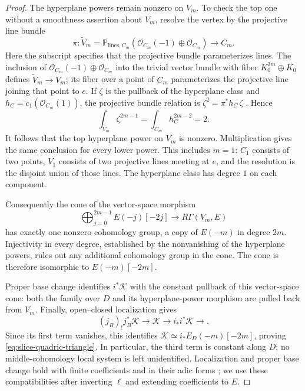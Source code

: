 \begin{proof}
The hyperplane powers remain nonzero on $V_m$.  To check the top one
without a smoothness assertion about $V_m$, resolve the vertex by the
projective line bundle
\[
 \pi:\widetilde V_m
   =\mathbb P_{\mathrm{lines},C_m}
        (\mathcal O_{C_m}(-1)\oplus\mathcal O_{C_m})
       \longrightarrow C_m.
\]
Here the subscript specifies that the projective bundle parameterizes
lines.  The inclusion of $\mathcal O_{C_m}(-1)\oplus\mathcal O_{C_m}$
into the trivial vector bundle with fiber $K_0^{2m}\oplus K_0$
defines $\widetilde V_m\to V_m$; its fiber over a point of $C_m$
parameterizes the projective line joining that point to $e$.
If $\zeta$ is the pullback
of the hyperplane class and $h_C=c_1(\mathcal O_{C_m}(1))$, the
projective bundle relation is $\zeta^2=\pi^*h_C\,\zeta$
\cite[\S23]{MilneEtale}. Hence
\[
 \int_{\widetilde V_m}\zeta^{2m-1}
       =\int_{C_m}h_C^{2m-2}=2.
\]
It follows that the top hyperplane power on $V_m$ is nonzero.
Multiplication gives the same conclusion for every lower power.
This includes $m=1$: $C_1$ consists of two points, $V_1$ consists of
two projective lines meeting at $e$, and the resolution is the
disjoint union of those lines.  The hyperplane class has degree $1$
on each component.

Consequently the cone of the vector-space morphism
\[
 \bigoplus_{j=0}^{2m-1}E(-j)[-2j]
       \longrightarrow R\Gamma(V_m,E)
\]
has exactly one nonzero cohomology group, a copy of $E(-m)$ in degree
$2m$.  Injectivity in every degree, established by the nonvanishing of
the hyperplane powers, rules out any additional cohomology group in
the cone.  The cone is therefore isomorphic to $E(-m)[-2m]$.

Proper base change identifies $i^*\mathcal K$ with the constant
pullback of this vector-space cone: both the family over $D$ and
its hyperplane-power morphism are pulled back from $V_m$.
Finally, open--closed localization gives
\[
 (j_B)_!j_B^*\mathcal K\longrightarrow\mathcal K
                  \longrightarrow i_*i^*\mathcal K\longrightarrow .
\]
Since its first term vanishes, this identifies
$\mathcal K\simeq i_*E_D(-m)[-2m]$, proving
\eqref{eq:slice-quadric-triangle}.  In particular, the third term is
constant along $D$; no middle-cohomology local system is left
unidentified. Localization and proper base change hold with finite
coefficients \cite[Tags 095L and 0DDE]{Stacks} and in their adic forms
\cite[Tags 09AH and 09C9]{Stacks}; we use these compatibilities after
inverting $\ell$ and extending coefficients to $E$.
\end{proof}

